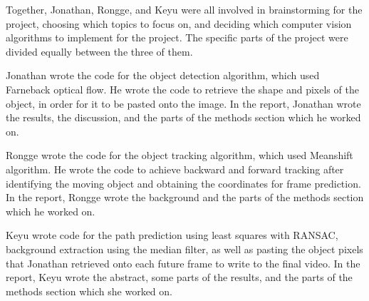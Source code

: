 \documentclass[12pt]{article}
\begin{document}
Together, Jonathan, Rongge, and Keyu were all involved in brainstorming for the project, choosing which topics to focus on, and deciding which computer vision algorithms to implement for the project. The specific parts of the project were divided equally between the three of them.

Jonathan wrote the code for the object detection algorithm, which used Farneback optical flow. He wrote the code to retrieve the shape and pixels of the object, in order for it to be pasted onto the image. In the report, Jonathan wrote the results, the discussion, and the parts of the methods section which he worked on. 

Rongge wrote the code for the object tracking algorithm, which used Meanshift algorithm. He wrote the code to achieve backward and forward tracking after identifying the moving object and obtaining the coordinates for frame prediction. In the report, Rongge wrote the background and the parts of the methods section which he worked on.

Keyu wrote code for the path prediction using least squares with RANSAC, background extraction using the median filter, as well as pasting the object pixels that Jonathan retrieved onto each future frame to write to the final video. In the report, Keyu wrote the abstract, some parts of the results, and the parts of the methods section which she worked on.

\clearpage

\clearpage


\url{}
\end{document}
